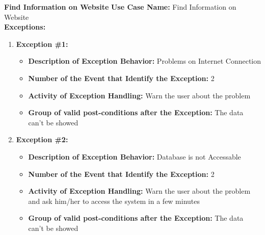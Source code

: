 \documentclass[11pt,twoside]{article}
\begin{document}
\textbf{Find Information on Website}
\textbf{Use Case Name:} Find Information on Website\\
\textbf{Exceptions:}
\begin{enumerate}
 \item \textbf{Exception \#1:}
 \begin{itemize}
  \item \textbf{Description of Exception Behavior:} Problems on Internet Connection
  \item \textbf{Number of the Event that Identify the Exception:} 2
  \item \textbf{Activity of Exception Handling:} Warn the user about the problem
  \item \textbf{Group of valid post-conditions after the Exception:} The data can't be showed
 \end{itemize}
 \item \textbf{Exception \#2:}
 \begin{itemize}
  \item \textbf{Description of Exception Behavior:} Database is not Accessable
  \item \textbf{Number of the Event that Identify the Exception:} 2
  \item \textbf{Activity of Exception Handling:} Warn the user about the problem and ask him/her to access the system in a few minutes
  \item \textbf{Group of valid post-conditions after the Exception:} The data can't be showed
 \end{itemize}
\end{enumerate}
\end{document}
